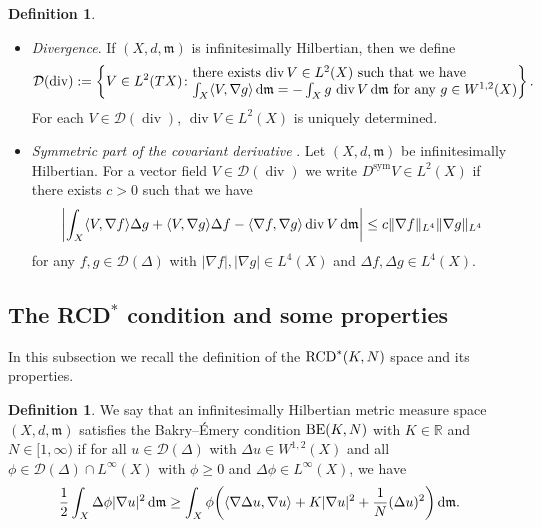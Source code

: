 \documentclass[pdftex]{sigma}
\numberwithin{equation}{section}
\theoremstyle{definition}
\newtheorem{Def}[Thm]{Definition}
\newcommand{\sym}{\operatorname{sym}}
\newcommand{\R}{\mathbb{R}}
\newcommand{\mf}{\mathfrak{m}}
\newcommand{\Div}{\operatorname{div}}
\newcommand{\RCD}{{\rm RCD}^\ast}
\newcommand{\BE}{{\rm BE}}
\newcommand{\D}{\mathcal{D}}
\begin{document}
\begin{Def}
\begin{itemize}
\item \emph{Divergence}. If $(X,d,\mf)$ is infinitesimally Hilbertian, then we define
\[
\D(\Div):=\left\{V\in L^{2}(T X)\colon \begin{array}{@{}l@{}}\text{there exists $\Div V \in L^2(X)$ such that we have}\\
\text{$\int_X \langle V, \nabla g\rangle\, {\rm d}\mf=-\int_X g\, \Div V \,{\rm d}\mf$ for any $g\in W^{1,2}(X)$}\end{array}  \right\} .
\]
For each $V\in\D(\Div)$, $\Div V\in L^2(X)$ is uniquely determined.
\item \emph{Symmetric part of the covariant derivative} \cite[Definition~5.4]{AT2}. Let $(X,d,\mf)$ be infinitesimally Hilbertian.
For a vector field $V\in \D(\Div)$ we write $D^{\sym} V\in L^2(X)$ if there exists $c>0$ such that we have
\begin{gather}\label{symd}
\left|\int_X \langle V,\nabla f\rangle \Delta g+ \langle V,\nabla g\rangle\Delta f -\langle\nabla f,\nabla g\rangle\Div V\,{\rm d}\mf\right|\leq c \|\nabla f\|_{L^4}\|\nabla g\|_{L^4}
\end{gather}
for any $f,g\in \D(\Delta)$ with $|\nabla f|,|\nabla g|\in L^4(X)$ and $\Delta f,\Delta g\in L^4(X)$.
\end{itemize}

\end{Def}
\subsection[The RCD* condition and some properties]{The RCD$^{\boldsymbol *}$ condition and some properties}
In this subsection we recall the definition of the $\RCD(K,N)$ space and its properties.
\begin{Def}
We say that an infinitesimally Hilbertian metric measure space $(X,d,\mf)$ satisfies the Bakry--\'{E}mery condition $\BE(K,N)$ with $K\in\R$ and $N\in [1,\infty)$ if for all $u\in\D(\Delta)$ with $\Delta u\in W^{1,2}(X)$ and all $\phi\in\D(\Delta)\cap L^\infty(X)$ with $\phi\geq0$ and $\Delta \phi\in L^\infty(X)$, we have
\begin{gather*}
\frac{1}{2}\int_{X}\Delta \phi|\nabla u|^2 \,{\rm d}\mf\geq \int_{X} \phi\bigg(\langle\nabla \Delta u,\nabla u\rangle+K|\nabla u|^2+\frac{1}{N}(\Delta u)^2\bigg) \,{\rm d}\mf.
\end{gather*}
\end{Def}
\end{document}
